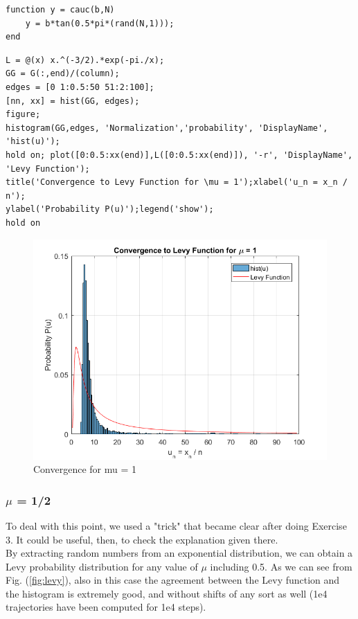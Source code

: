 \documentclass[11pt,letterpaper]{article}
\begin{document}
\begin{lstlisting}
function y = cauc(b,N)
    y = b*tan(0.5*pi*(rand(N,1)));
end
\end{lstlisting}

\begin{lstlisting}
L = @(x) x.^(-3/2).*exp(-pi./x);
GG = G(:,end)/(column);
edges = [0 1:0.5:50 51:2:100];
[nn, xx] = hist(GG, edges);
figure;
histogram(GG,edges, 'Normalization','probability', 'DisplayName', 'hist(u)');
hold on; plot([0:0.5:xx(end)],L([0:0.5:xx(end)]), '-r', 'DisplayName', 'Levy Function');
title('Convergence to Levy Function for \mu = 1');xlabel('u_n = x_n / n');
ylabel('Probability P(u)');legend('show');
hold on
\end{lstlisting}

\begin{figure}
\centering
\includegraphics[width=0.9\linewidth]{./exercise2_3}
\caption{Convergence for mu = 1}
\label{fig:exercise2_3}
\end{figure}

\subsubsection{$\mu$ = 1/2}
To deal with this point, we used a "trick" that became clear after doing Exercise 3. It could be useful, then, to check the explanation given there.\\
By extracting random numbers from an exponential distribution, we can obtain a Levy probability distribution for any value of $\mu$ including 0.5. As we can see from Fig. (\ref{fig:levy}), also in this case the agreement between the Levy function and the histogram is extremely good, and without shifts of any sort as well (1e4 trajectories have been computed for 1e4 steps).
\end{document}
